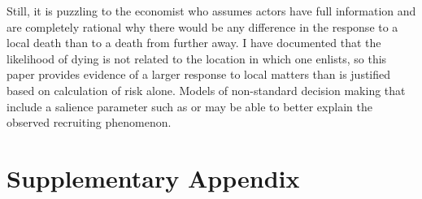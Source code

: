 \documentclass[12pt] {article}
\begin{document}
Still, it is puzzling to the economist who assumes actors have full
information and are completely rational why there would be any difference
in the response to a local death than to a death from further away.
I have documented that the likelihood of dying is not related to the
location in which one enlists, so this paper provides evidence of
a larger response to local matters than is justified based on calculation
of risk alone. Models of non-standard decision making that include
a salience parameter such as \cite{ChettySalience} or \cite{eBayEarly}
may be able to better explain the observed recruiting phenomenon. 

\newpage



\clearpage{}





\appendix

\section{Supplementary Appendix}
\setcounter{table}{0}
\renewcommand{\thetable}{A\arabic{table}}

\setcounter{figure}{0}
\renewcommand{\thefigure}{A\arabic{figure}}


\end{document}
